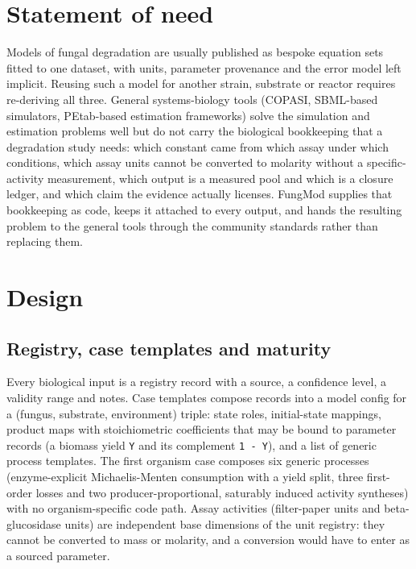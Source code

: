 \documentclass[11pt,a4paper]{article}
\begin{document}
\section{Statement of need}

Models of fungal degradation are usually published as bespoke equation
sets fitted to one dataset, with units, parameter provenance and the error
model left implicit. Reusing such a model for another strain, substrate or
reactor requires re-deriving all three. General systems-biology tools
(COPASI, SBML-based simulators, PEtab-based estimation frameworks) solve the
simulation and estimation problems well but do not carry the biological
bookkeeping that a degradation study needs: which constant came from which
assay under which conditions, which assay units cannot be converted to
molarity without a specific-activity measurement, which output is a measured
pool and which is a closure ledger, and which claim the evidence actually
licenses. FungMod supplies that bookkeeping as code, keeps it attached to
every output, and hands the resulting problem to the general tools through
the community standards rather than replacing them.

\section{Design}

\subsection{Registry, case templates and maturity}

Every biological input is a registry record with a source, a confidence
level, a validity range and notes. Case templates compose records into a
model config for a (fungus, substrate, environment) triple: state roles,
initial-state mappings, product maps with stoichiometric coefficients that
may be bound to parameter records (a biomass yield \texttt{Y} and its
complement \texttt{1 - Y}), and a list of generic process templates. The
first organism case composes six generic processes (enzyme-explicit
Michaelis-Menten consumption with a yield split, three first-order losses
and two producer-proportional, saturably induced activity syntheses) with no
organism-specific code path. Assay activities (filter-paper units and
beta-glucosidase units) are independent base dimensions of the unit
registry: they cannot be converted to mass or molarity, and a conversion
would have to enter as a sourced parameter.
\end{document}
